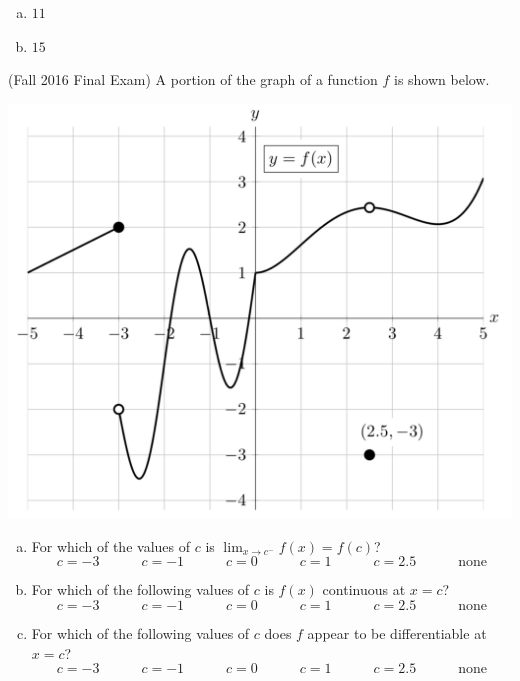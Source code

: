 \documentclass[11pt]{exam}
\begin{document}
\begin{questions}
\begin{solution}
\begin{enumerate}[(a)]
    \item \(11\)
    \item \(15\)
    \end{enumerate}
  \end{solution}
\question (Fall 2016 Final Exam) %
	A portion of the graph of a function $f$ is shown below.
        \begin{center}
		\includegraphics[scale=0.5]{Figures/graphf}
        \end{center}
	\begin{enumerate}[(a)]
		\item For which of the values of $c$ is $\lim_{x \rightarrow c^-} f(x) = f(c)$?
		$$c=-3 \hspace{3em} c=-1 \hspace{3em} c=0 \hspace{3em} c=1 \hspace{3em} c=2.5 \hspace{3em} \textrm{none}$$
		\item For which of the following values of $c$ is $f(x)$ continuous at $x=c$?
		$$c=-3 \hspace{3em} c=-1 \hspace{3em} c=0 \hspace{3em} c=1 \hspace{3em} c=2.5 \hspace{3em} \textrm{none}$$
		\item For which of the following values of $c$ does $f$ appear to be differentiable at $x=c$?
		$$c=-3 \hspace{3em} c=-1 \hspace{3em} c=0 \hspace{3em} c=1 \hspace{3em} c=2.5 \hspace{3em} \textrm{none}$$

\end{enumerate}
\end{questions}
\end{document}
